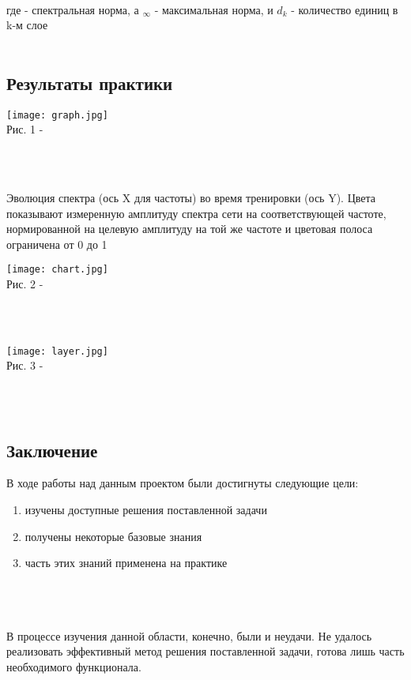 \documentclass{article}
\begin{document}
    \\
    где \Vert  \Vert - спектральная норма, а \Vert  \Vert$_{\infty}$ - максимальная норма, и $d_k$ - количество единиц в k-м слое
    \\ \\
    \newpage
    \begin{center} 
    \section{Результаты практики}
    \end{center}
    \large
    
    \begin{center} 
    \texttt{[image: graph.jpg]}
    \\
    \caption{Рис. 1 - }
    \\ \\
    \end{center} 
    Эволюция спектра (ось X для частоты) во время тренировки (ось Y). Цвета показывают измеренную амплитуду спектра сети на соответствующей частоте, нормированной на целевую амплитуду на той же частоте и цветовая полоса ограничена от 0 до 1
    \begin{center} 
    \texttt{[image: chart.jpg]}
    \\
    \caption{Рис. 2 - }
    \\ \\
    \end{center} 
    
    \begin{center} 
    \texttt{[image: layer.jpg]}
    \\
    \caption{Рис. 3 - }
    \\ \\
    \end{center} 
    
    \newpage
    \begin{center} 
    \section{Заключение}
    \end{center}
    \large
    В ходе работы над данным проектом были достигнуты следующие цели:\\
    \begin{enumerate}
        \item изучены доступные решения поставленной задачи
        \item получены некоторые базовые знания
        \item часть этих знаний применена на практике
    \end{enumerate}
    \\ \\ \\
    В процессе изучения данной области, конечно, были и неудачи. Не удалось реализовать эффективный метод решения поставленной задачи, готова лишь часть необходимого функционала.
    \\ \\
    
\end{document}
